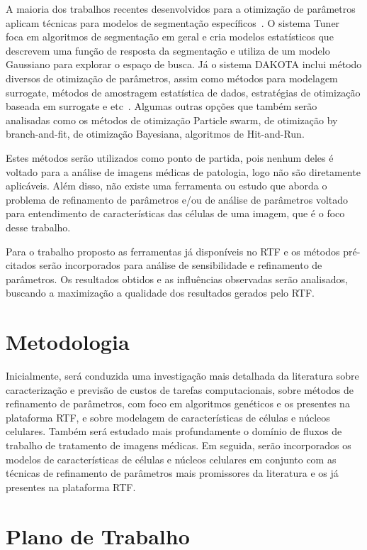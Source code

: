 \documentclass[a4paper,10pt]{article}
\begin{document}
A maioria dos trabalhos recentes desenvolvidos para a otimização de parâmetros aplicam técnicas para modelos de segmentação específicos~\cite{kumar2003discriminative, szummer2008learning, mcintosh2007single, schultz2013open}. O sistema Tuner~\cite{torsney2011tuner} foca em algoritmos de segmentação em geral e cria modelos estatísticos que descrevem uma função de resposta da segmentação e utiliza de um modelo Gaussiano para explorar o espaço de busca. Já o sistema DAKOTA inclui método diversos de otimização de parâmetros, assim como métodos para modelagem surrogate, métodos de amostragem estatística de dados, estratégias de otimização baseada em surrogate e etc~\cite{giunta2002use}. Algumas outras opções que também serão analisadas como os métodos de otimização Particle swarm, de otimização by branch-and-fit, de otimização Bayesiana, algoritmos de Hit-and-Run.

Estes métodos serão utilizados como ponto de partida, pois nenhum deles é voltado para a análise de imagens médicas de patologia, logo não são diretamente aplicáveis. Além disso, não existe uma ferramenta ou estudo que aborda o problema de refinamento de parâmetros e/ou de análise de parâmetros voltado para entendimento de características das células de uma imagem, que é o foco desse trabalho.

Para o trabalho proposto as ferramentas já disponíveis no RTF e os métodos pré-citados serão incorporados para análise de sensibilidade e refinamento de parâmetros. Os resultados obtidos e as influências observadas serão analisados, buscando a maximização a qualidade dos resultados gerados pelo RTF. 

\section{Metodologia}
Inicialmente, será conduzida uma investigação mais detalhada da literatura sobre caracterização e previsão de custos de tarefas computacionais, sobre métodos de refinamento de parâmetros, com foco em algoritmos genéticos e os presentes na plataforma RTF, e sobre modelagem de características de células e núcleos celulares. Também será estudado mais profundamente o domínio de fluxos de trabalho de tratamento de imagens médicas. Em seguida, serão incorporados os modelos de características de células e núcleos celulares em conjunto com as técnicas de refinamento de parâmetros mais promissores da literatura e os já presentes na plataforma RTF.

\section{Plano de Trabalho}
\end{document}
